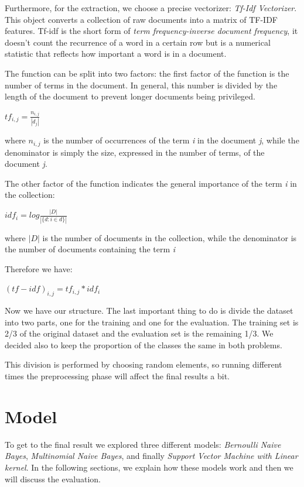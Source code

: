 \documentclass[12pt]{article}
\begin{document}
Furthermore, for the extraction, we choose a precise vectorizer: {\em Tf-Idf Vectorizer}. This object converts a collection of raw documents into a matrix of TF-IDF features. Tf-idf is the short form of {\em term frequency-inverse document frequency}, it doesn't count the recurrence of a word in a certain row but is a numerical statistic that reflects how important a word is in a document.

The function can be split into two factors: the first factor of the function is the number of terms in the document. In general, this number is divided by the length of the document to prevent longer documents being privileged.

\bigskip
$tf_{i,j} = \displaystyle \frac {n_{i,j}}{|d_j|} $
\bigskip

where $n_{i,j}$ is the number of occurrences of the term {\em i} in the document {\em j}, while the denominator is simply the size, expressed in the number of terms, of the document {\em j}.

The other factor of the function indicates the general importance of the term {\em i} in the collection:

\bigskip
$idf_{i} = log \displaystyle \frac {|D|}{|\{ d : i \in d \}|} $
\bigskip

where $|D|$ is the number of documents in the collection, while the denominator is the number of documents containing the term {\em i}

Therefore we have:

\bigskip
$(tf-idf)_{i,j} = tf_{i,j} * idf_{i}$
\bigskip

Now we have our structure. The last important thing to do is divide the dataset into two parts, one for the training and one for the evaluation. The training set is 2/3 of the original dataset and the evaluation set is the remaining 1/3. We decided also to keep the proportion of the classes the same in both problems.

This division is performed by choosing random elements, so running different times the preprocessing phase will affect the final results a bit.

\section{Model}
To get to the final result we explored three different models: {\em Bernoulli Naive Bayes}, {\em Multinomial Naive Bayes}, and finally {\em Support Vector Machine with Linear kernel}. In the following sections, we explain how these models work and then we will discuss the evaluation.
\end{document}
